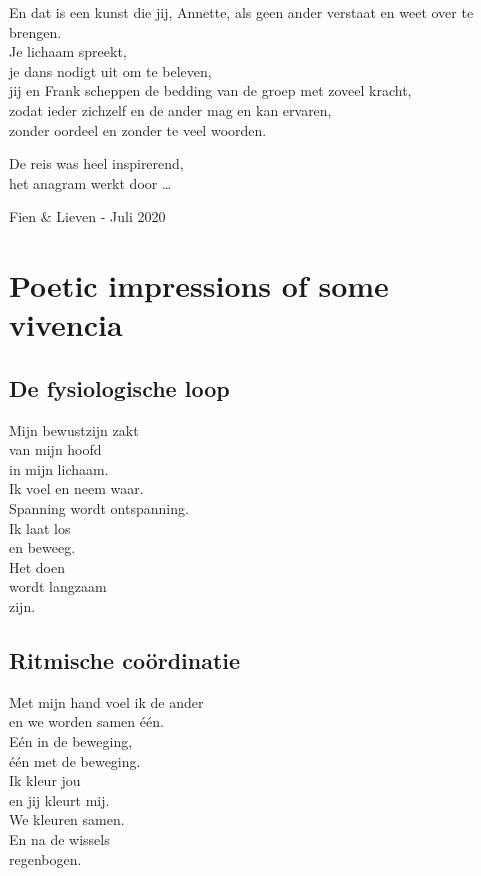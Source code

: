 \documentclass[
  11pt,
]{book}
\begin{document}
En dat is een kunst die jij, Annette, als geen ander verstaat en weet over te brengen.\\
Je lichaam spreekt,\\
je dans nodigt uit om te beleven,\\
jij en Frank scheppen de bedding van de groep met zoveel kracht,\\
zodat ieder zichzelf en de ander mag en kan ervaren,\\
zonder oordeel en zonder te veel woorden.

De reis was heel inspirerend,\\
het anagram werkt door \ldots{}

Fien \& Lieven - Juli 2020

\hypertarget{poetic-impressions-of-some-vivencia}{%
\section*{Poetic impressions of some vivencia}\label{poetic-impressions-of-some-vivencia}}

\hypertarget{de-fysiologische-loop}{%
\subsection*{De fysiologische loop}\label{de-fysiologische-loop}}

Mijn bewustzijn zakt\\
van mijn hoofd\\
in mijn lichaam.\\
Ik voel en neem waar.\\
Spanning wordt ontspanning.\\
Ik laat los\\
en beweeg.\\
Het doen\\
wordt langzaam\\
zijn.

\hypertarget{ritmische-couxf6rdinatie}{%
\subsection*{Ritmische coördinatie}\label{ritmische-couxf6rdinatie}}

Met mijn hand voel ik de ander\\
en we worden samen één.\\
Eén in de beweging,\\
één met de beweging.\\
Ik kleur jou\\
en jij kleurt mij.\\
We kleuren samen.\\
En na de wissels\\
regenbogen.
\end{document}
